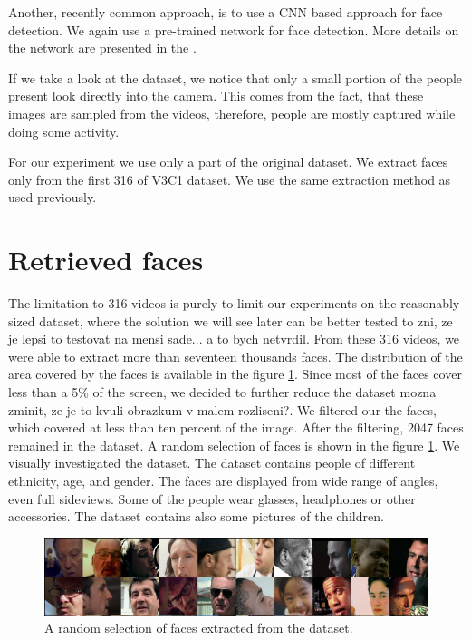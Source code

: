 Another, recently common approach, is to use a CNN based approach for face detection. We again use a pre-trained network for face detection. More details on the network are presented in the \cite{}. 

If we take a look at the dataset, we notice that only a small portion of the people present look directly into the camera. This comes from the fact, that these images are sampled from the videos, therefore, people are mostly captured while doing some activity.

For our experiment we use only a part of the original dataset. We extract faces only from the first 316 of V3C1 dataset. We use the same extraction method as used previously.

\section{Retrieved faces}

The limitation to 316 videos is purely to limit our experiments on the reasonably sized dataset, where the solution we will see later can be better tested {\color{red} to zni, ze je lepsi to testovat na mensi sade... a to bych netvrdil}. From these 316 videos, we were able to extract more than seventeen thousands faces. The distribution of the area covered by the faces is available in the figure \ref{}. Since most of the faces cover less than a 5\% of the screen, we decided to further reduce the dataset {\color{red} mozna zminit, ze je to kvuli obrazkum v malem rozliseni?}. We filtered our the faces, which covered at less than ten percent of the image. After the filtering, 2047 faces remained in the dataset. A random selection of faces is shown in the figure \ref{fig:random_selection_faces}. We visually investigated the dataset. The dataset contains people of different ethnicity, age, and gender. The faces are displayed from wide range of angles, even full sideviews. Some of the people wear glasses, headphones or other accessories. The dataset contains also some pictures of the children.

\begin{figure}
    \centering
    \includegraphics[width=0.98\linewidth]{img/random_selection_faces.pdf}
    \caption{A random selection of faces extracted from the dataset.}
    \label{fig:random_selection_faces}
\end{figure}

